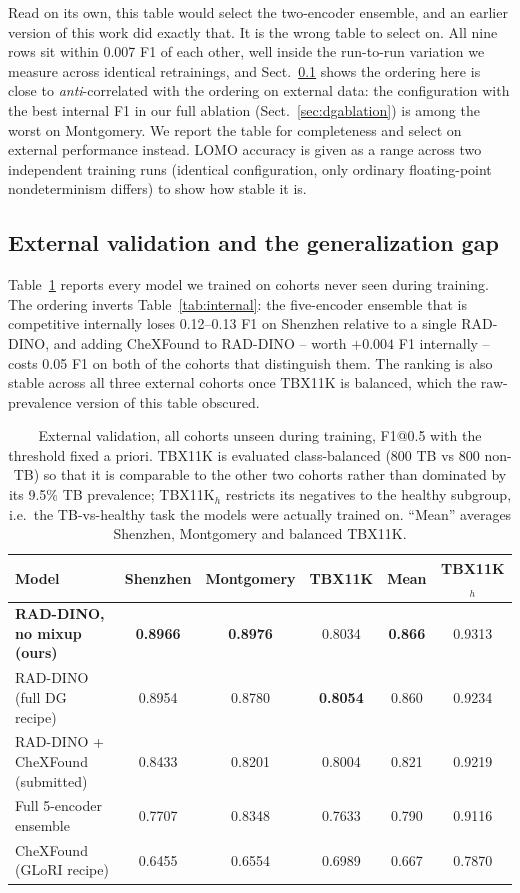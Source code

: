 \documentclass[runningheads]{llncs}
\begin{document}
Read on its own, this table would select the two-encoder ensemble, and an
earlier version of this work did exactly that. It is the wrong table to
select on. All nine rows sit within 0.007 F1 of each other, well inside the
run-to-run variation we measure across identical retrainings, and
Sect.~\ref{sec:external} shows the ordering here is close to
\emph{anti}-correlated with the ordering on external data: the
configuration with the best internal F1 in our full ablation
(Sect.~\ref{sec:dgablation}) is among the worst on Montgomery. We report
the table for completeness and select on external performance instead. LOMO
accuracy is given as a range across two independent training runs
(identical configuration, only ordinary floating-point nondeterminism
differs) to show how stable it is.

\subsection{External validation and the generalization gap}
\label{sec:external}

Table~\ref{tab:external} reports every model we trained on cohorts never
seen during training. The ordering inverts Table~\ref{tab:internal}: the
five-encoder ensemble that is competitive internally loses 0.12--0.13 F1 on
Shenzhen relative to a single RAD-DINO, and adding CheXFound to RAD-DINO --
worth $+0.004$ F1 internally -- costs 0.05 F1 on both of the cohorts that
distinguish them. The ranking is also stable across all three external
cohorts once TBX11K is balanced, which the raw-prevalence version of this
table obscured.

\begin{table}[t]
\centering
\setlength{\tabcolsep}{5pt}
\caption{External validation, all cohorts unseen during training, F1@0.5
with the threshold fixed a priori. TBX11K is evaluated class-balanced (800
TB vs 800 non-TB) so that it is comparable to the other two cohorts rather
than dominated by its 9.5\% TB prevalence; TBX11K$_{h}$ restricts its
negatives to the healthy subgroup, i.e.\ the TB-vs-healthy task the models
were actually trained on. ``Mean'' averages Shenzhen, Montgomery and
balanced TBX11K.}
\label{tab:external}
\begin{tabular}{lccccc}
\toprule
Model & Shenzhen & Montgomery & TBX11K & Mean & TBX11K$_{h}$ \\
\midrule
\textbf{RAD-DINO, no mixup (ours)} & \textbf{0.8966} & \textbf{0.8976} & 0.8034 & \textbf{0.866} & 0.9313 \\
RAD-DINO (full DG recipe)          & 0.8954 & 0.8780 & \textbf{0.8054} & 0.860 & 0.9234 \\
RAD-DINO + CheXFound (submitted)   & 0.8433 & 0.8201 & 0.8004 & 0.821 & 0.9219 \\
Full 5-encoder ensemble            & 0.7707 & 0.8348 & 0.7633 & 0.790 & 0.9116 \\
CheXFound (GLoRI recipe)           & 0.6455 & 0.6554 & 0.6989 & 0.667 & 0.7870 \\
\bottomrule
\end{tabular}
\end{table}
\end{document}
